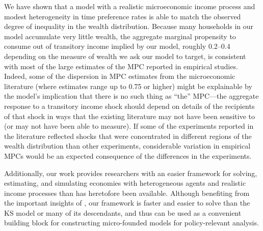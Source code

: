 \documentclass[12pt,titlepage]{econtex}
\begin{document}
We have shown that a model with a realistic microeconomic income process and modest heterogeneity in time preference rates is able to match the observed degree of inequality in the wealth distribution.  Because many households in our model accumulate very little wealth, the aggregate marginal propensity to consume out of transitory income implied by our model, roughly 0.2--0.4 depending on the measure of wealth we ask our model to target, is consistent with most of the large estimates of the MPC reported in empirical studies. Indeed, some of the dispersion in MPC estimates from the microeconomic literature (where estimates range up to 0.75 or higher) might be explainable by the model's implication that there is no such thing as ``the'' MPC---the aggregate response to a transitory income shock should depend on details of the recipients of that shock in ways that the existing literature may not have been sensitive to (or may not have been able to measure).  If some of the experiments reported in the literature reflected shocks that were concentrated in different regions of the wealth distribution than other experiments, considerable variation in empirical MPCs would be an expected consequence of the differences in the experiments.

Additionally, our work provides researchers with an easier framework
for solving, estimating, and simulating economies with heterogeneous
agents and realistic income processes than has heretofore been
available. Although benefiting from the important insights of \citet{ksHetero},
our framework is faster and easier to solve than the KS model or many of its
descendants, and thus can be used as a convenient building block for
constructing micro-founded models for policy-relevant analysis.

\small

\end{document}
